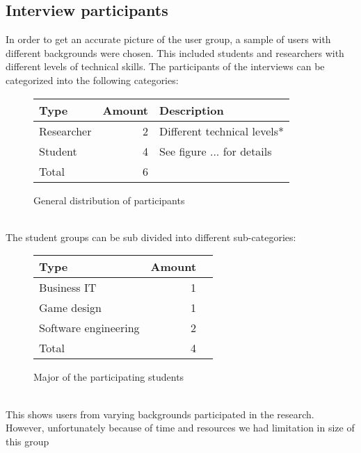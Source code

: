 \documentclass[conference]{IEEEtran}
\begin{document}
	\subsection{Interview participants}
		In order to get an accurate picture of the user group, a sample of users with different backgrounds were chosen. This included students and researchers with different levels of technical skills. The participants of the interviews can be categorized into the following categories:
		\begin{figure}[ht]
			\centering
			\begin{tabular}{ | l | r | l | }
				\hline
				Type			& Amount	& Description \\ \hline \hline
				Researcher		& 2			& Different technical levels* \\ \hline
				Student			& 4			& See figure ... for details \\ \hline \hline
				Total			& 6			& \\ \hline
			\end{tabular}
			\caption{General distribution of participants}
		\end{figure}\\
		The student groups can be sub divided into different sub-categories:
		\begin{figure}[ht]
			\centering
			\begin{tabular}{ | l | r | l | }
				\hline
				Type					& Amount \\ \hline \hline
				Business IT				& 1 \\ \hline
				Game design				& 1 \\ \hline
				Software engineering	& 2 \\ \hline
				Total					& 4 \\ \hline
			\end{tabular}
			\caption{Major of the participating students}
		\end{figure} \\
		This shows users from varying backgrounds participated in the research. However, unfortunately because of time and resources we had limitation in size of this group
\end{document}
